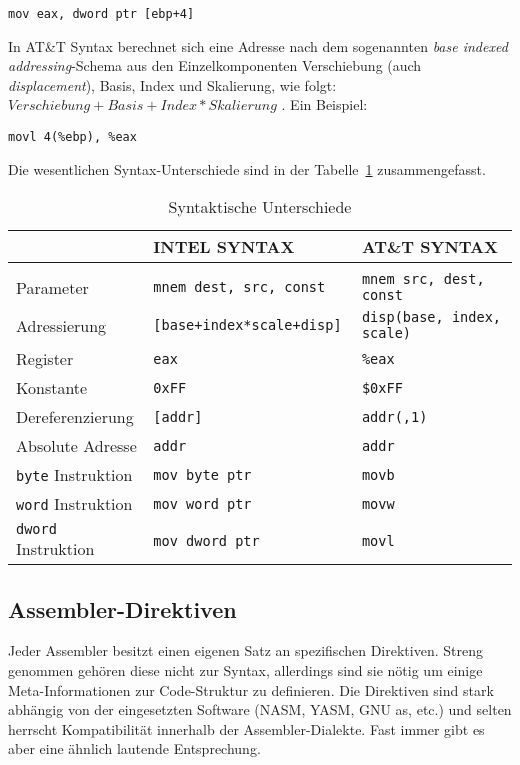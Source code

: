 \hspace{5mm} 
\texttt{mov eax, dword ptr [ebp+4]}

In AT\&T Syntax berechnet sich eine Adresse nach dem sogenannten \emph{base
indexed addressing}-Schema aus den Einzelkomponenten Verschiebung (auch
\emph{displacement}), Basis, Index und Skalierung, wie folgt: $Verschiebung + Basis +
Index*Skalierung$ . Ein Beispiel:

\hspace{5mm} 
\texttt{movl 4(\%ebp), \%eax}

Die wesentlichen Syntax-Unterschiede sind in der Tabelle~\ref{tab:syntaxdiffs}
zusammengefasst.


\begin{table}[ht]  %
\begin{tabular}{lll}
\\                            & INTEL SYNTAX                  & AT\&T SYNTAX
\\\hline
\\  Parameter                 & \tt mnem dest, src, const     & \tt mnem src, dest, const
\\  Adressierung              & \tt [base+index*scale+disp]   & \tt disp(base, index, scale)
\\  Register                  & \tt eax                       & \tt \%eax
\\  Konstante                 & \tt 0xFF                      & \tt \$0xFF
\\  Dereferenzierung          & \tt [addr]                    & \tt addr(,1)
\\  Absolute Adresse          & \tt addr                      & \tt *addr
\\  {\tt byte} Instruktion    & \tt mov byte ptr              & \tt movb
\\  {\tt word} Instruktion    & \tt mov word ptr              & \tt movw
\\  {\tt dword} Instruktion   & \tt mov dword ptr             & \tt movl
\end{tabular}
\caption{Syntaktische Unterschiede} \label{tab:syntaxdiffs}
\end{table}

\subsection{Assembler-Direktiven}
Jeder Assembler besitzt einen eigenen Satz an spezifischen Direktiven. Streng
genommen gehören diese nicht zur Syntax, allerdings sind sie nötig um einige
Meta-Informationen zur Code-Struktur zu definieren. Die Direktiven sind stark
abhängig von der eingesetzten Software (NASM, YASM, GNU as, etc.) und selten
herrscht Kompatibilität innerhalb der Assembler-Dialekte. Fast immer gibt es aber eine
ähnlich lautende Entsprechung.

